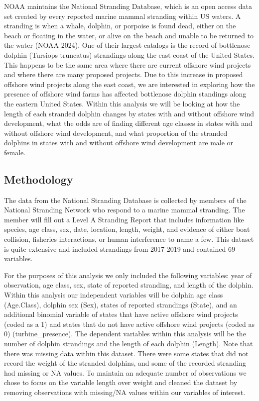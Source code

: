 \documentclass[
]{article}
\begin{document}
NOAA maintains the National Stranding Database, which is an open access
data set created by every reported marine mammal stranding within US
waters. A stranding is when a whale, dolphin, or porpoise is found dead,
either on the beach or floating in the water, or alive on the beach and
unable to be returned to the water (NOAA 2024). One of their largest
catalogs is the record of bottlenose dolphin (Tursiops truncatus)
strandings along the east coast of the United States. This happens to be
the same area where there are current offshore wind projects and where
there are many proposed projects. Due to this increase in proposed
offshore wind projects along the east coast, we are interested in
exploring how the presence of offshore wind farms has affected
bottlenose dolphin standings along the eastern United States. Within
this analysis we will be looking at how the length of each stranded
dolphin changes by states with and without offshore wind development,
what the odds are of finding different age classes in states with and
without offshore wind development, and what proportion of the stranded
dolphins in states with and without offshore wind development are male
or female.

\hypertarget{methodology}{%
\subsection{Methodology}\label{methodology}}

The data from the National Stranding Database is collected by members of
the National Stranding Network who respond to a marine mammal stranding.
The member will fill out a Level A Stranding Report that includes
information like species, age class, sex, date, location, length,
weight, and evidence of either boat collision, fisheries interactions,
or human interference to name a few. This dataset is quite extensive and
included strandings from 2017-2019 and contained 69 variables.

For the purposes of this analysis we only included the following
variables: year of observation, age class, sex, state of reported
stranding, and length of the dolphin. Within this analysis our
independent variables will be dolphin age class (Age.Class), dolphin sex
(Sex), states of reported strandings (State), and an additional binomial
variable of states that have active offshore wind projects (coded as a
1) and states that do not have active offshore wind projects (coded as
0) (turbine\_presence). The dependent variables within this analysis
will be the number of dolphin strandings and the length of each dolphin
(Length). Note that there was missing data within this dataset. There
were some states that did not record the weight of the stranded
dolphins, and some of the recorded stranding had missing or NA values.
To maintain an adequate number of observations we chose to focus on the
variable length over weight and cleaned the dataset by removing
observations with missing/NA values within our variables of interest.
\end{document}
